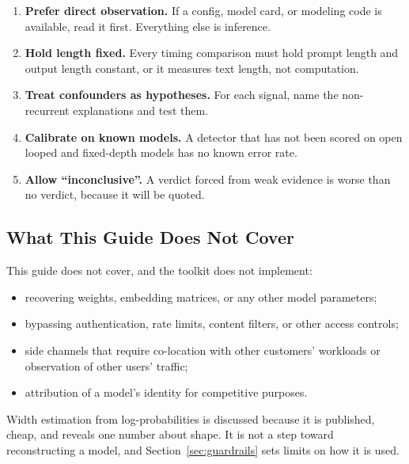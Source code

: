 \documentclass[11pt,letterpaper]{article}
\begin{document}
\begin{keybox}
\begin{enumerate}
  \item \textbf{Prefer direct observation.} If a config, model card, or modeling code is available, read it first. Everything else is inference.
  \item \textbf{Hold length fixed.} Every timing comparison must hold prompt length and output length constant, or it measures text length, not computation.
  \item \textbf{Treat confounders as hypotheses.} For each signal, name the non-recurrent explanations and test them.
  \item \textbf{Calibrate on known models.} A detector that has not been scored on open looped and fixed-depth models has no known error rate.
  \item \textbf{Allow ``inconclusive''.} A verdict forced from weak evidence is worse than no verdict, because it will be quoted.
\end{enumerate}
\end{keybox}

\subsection{What This Guide Does Not Cover}
\label{sec:notcovered}

\begin{scopebox}
This guide does not cover, and the toolkit does not implement:
\begin{itemize}
  \item recovering weights, embedding matrices, or any other model parameters;
  \item bypassing authentication, rate limits, content filters, or other access controls;
  \item side channels that require co-location with other customers' workloads or observation of other users' traffic;
  \item attribution of a model's identity for competitive purposes.
\end{itemize}
Width estimation from log-probabilities is discussed because it is published, cheap, and reveals one number about shape. It is not a step toward reconstructing a model, and Section~\ref{sec:guardrails} sets limits on how it is used.
\end{scopebox}

\end{document}
